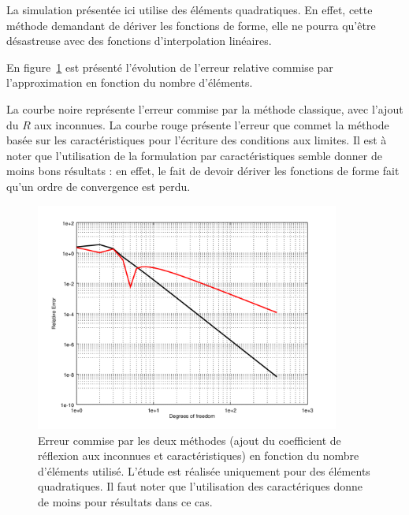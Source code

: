 La simulation présentée ici utilise des éléments quadratiques. En effet, cette méthode demandant de dériver les
fonctions de forme, elle ne pourra qu'être désastreuse avec des fonctions d'interpolation linéaires.

En figure~\ref{fig:conv_DGMlike_quad} est présenté l'évolution de l'erreur relative commise par l'approximation en
fonction du nombre d'éléments.

La courbe noire représente l'erreur commise par la méthode classique, avec l'ajout du $R$ aux inconnues. La courbe rouge
présente l'erreur que commet la méthode basée sur les caractéristiques pour l'écriture des conditions aux limites. Il
est à noter que l'utilisation de la formulation par caractéristiques semble donner de moins bons résultats : en effet,
le fait de devoir dériver les fonctions de forme fait qu'un ordre de convergence est perdu.

\begin{figure}[!ht]
	\centering
	\includegraphics[width=10cm]{part3/figs/convergence.png}
	\caption{\label{fig:conv_DGMlike_quad}Erreur commise par les deux méthodes (ajout du coefficient de réflexion aux
	inconnues et caractéristiques) en fonction du nombre d'éléments utilisé. L'étude est réalisée uniquement pour des
	éléments quadratiques. Il faut noter que l'utilisation des caractériques donne de moins pour résultats dans ce cas.}
\end{figure}
